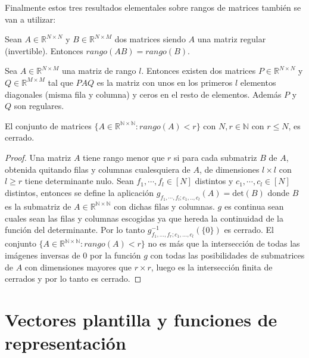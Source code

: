 Finalmente estos tres resultados elementales sobre rangos de matrices también se van a utilizar:

\begin{lema} \label{lema:rangoProducto}
Sean $A\in\mathbb{R}^{N\times N}$ y $B\in\mathbb{R}^{N\times M}$ dos matrices siendo $A$ una matriz regular (invertible). Entonces $\textit{rango}(AB) = \textit{rango}(B)$.
\end{lema}

\begin{lema} \label{lema:diagonalValoresPropios}
Sea $A\in\mathbb{R}^{N\times M}$ una matriz de rango $l$. Entonces existen dos matrices $P\in\mathbb{R}^{N\times N}$ y $Q\in\mathbb{R}^{M\times M}$ tal que $PAQ$ es la matriz con unos en los primeros $l$ elementos diagonales (misma fila y columna) y ceros en el resto de elementos. Además $P$ y $Q$ son regulares.
\end{lema}

\begin{lema} \label{lema:cerradasMatricesRangoMayorado}
El conjunto de matrices $\{A\in\mathbb{R}^\mathbb{N\times N} : \textit{rango}(A) < r\}$ con $N,r \in \mathbb{N}$ con $r \leq N$, es cerrado.
\end{lema}
\begin{proof}
 Una matriz $A$ tiene rango menor que $r$ si para cada submatriz $B$ de $A$, obtenida quitando filas y columnas cualesquiera de $A$, de dimensiones $l\times l$ con $l \geq r$ tiene determinante nulo. Sean $f_1,\cdots ,f_l\in [N]$ distintos y $c_1,\cdots ,c_l\in [N]$ distintos, entonces se define la aplicación $g_{f_1,\cdots ,f_l;c_1,..,c_l}(A) = \text{det}(B)$ donde $B$ es la submatriz de $A\in\mathbb{R}^\mathbb{N\times N}$ con dichas filas y columnas. $g$ es continua sean cuales sean las filas y columnas escogidas ya que hereda la continuidad de la función del determinante. Por lo tanto $g^{-1}_{f_1,... ,f_r;c_1,...,c_l}(\{0\})$ es cerrado. El conjunto $\{A\in\mathbb{R}^\mathbb{N\times N} : \textit{rango}(A) < r\}$ no es más que la intersección de todas las imágenes inversas de $0$ por la función $g$ con todas las posibilidades de submatrices de $A$ con dimensiones mayores que $r\times r$, luego es la intersección finita de cerrados y por lo tanto es cerrado. 
\end{proof}


\section{Vectores plantilla y funciones de representación}

